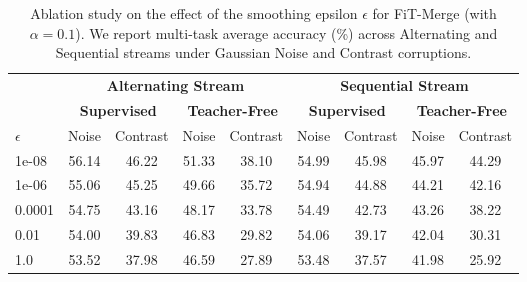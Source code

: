\begin{table}[t]
\caption{Ablation study on the effect of the smoothing epsilon $\epsilon$ for FiT-Merge (with $\alpha = 0.1$). We report multi-task average accuracy (\%) across Alternating and Sequential streams under Gaussian Noise and Contrast corruptions.}
\label{tab:ablation_epsilon}
\vskip 0.05in
\begin{center}
\begin{scriptsize}
\begin{sc}
\begin{tabular}{lcccccccc}
\toprule
& \multicolumn{4}{c}{\textbf{Alternating Stream}} & \multicolumn{4}{c}{\textbf{Sequential Stream}} \\
\cmidrule(r){2-5} \cmidrule(l){6-9}
& \multicolumn{2}{c}{\textbf{Supervised}} & \multicolumn{2}{c}{\textbf{Teacher-Free}} & \multicolumn{2}{c}{\textbf{Supervised}} & \multicolumn{2}{c}{\textbf{Teacher-Free}} \\
\cmidrule(r){2-3} \cmidrule(l){4-5} \cmidrule(r){6-7} \cmidrule(l){8-9}
$\epsilon$ & Noise & Contrast & Noise & Contrast & Noise & Contrast & Noise & Contrast \\
\midrule
1e-08    & 56.14 & 46.22 & 51.33 & 38.10 & 54.99 & 45.98 & 45.97 & 44.29 \\
1e-06    & 55.06 & 45.25 & 49.66 & 35.72 & 54.94 & 44.88 & 44.21 & 42.16 \\
0.0001   & 54.75 & 43.16 & 48.17 & 33.78 & 54.49 & 42.73 & 43.26 & 38.22 \\
0.01     & 54.00 & 39.83 & 46.83 & 29.82 & 54.06 & 39.17 & 42.04 & 30.31 \\
1.0      & 53.52 & 37.98 & 46.59 & 27.89 & 53.48 & 37.57 & 41.98 & 25.92 \\
\bottomrule
\end{tabular}
\end{sc}
\end{scriptsize}
\end{center}
\vskip -0.15in
\end{table}
